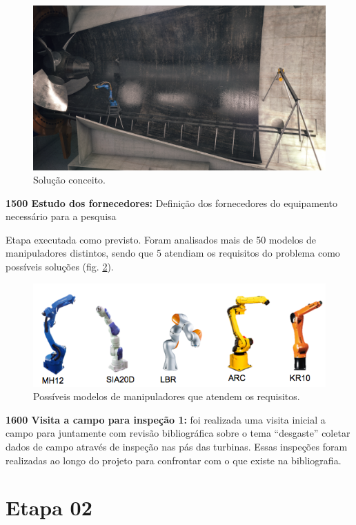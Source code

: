 \begin{figure}
\centering
\label{fig::conceito}
\includegraphics[width=0.9\columnwidth]{figs/turbine_evo}
\caption{Solução conceito.}
\label{fig::conceito1}
\end{figure}

\noindent
\textbf{1500 Estudo dos fornecedores:} Definição dos fornecedores do equipamento
necessário para a pesquisa

Etapa executada como previsto. Foram analisados mais de 50 modelos de
manipuladores distintos, sendo que 5 atendiam os requisitos do problema como
possíveis soluções (fig. \ref{fig::modelos_robos}).

\begin{figure}[h!]
\centering
\includegraphics[width=0.9\columnwidth]{figs/robots}
\caption{Possíveis modelos de manipuladores que atendem os requisitos.}
\label{fig::modelos_robos}
\end{figure}

\noindent
\textbf{1600 Visita a campo para inspeção 1:} foi realizada uma visita inicial
a campo para juntamente com revisão bibliográfica sobre o tema “desgaste”
coletar dados de campo através de inspeção nas pás das turbinas. Essas inspeções
foram realizadas ao longo do projeto para confrontar com o que existe na
bibliografia.


\section{Etapa 02}

